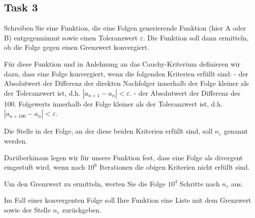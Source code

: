 \documentclass[11pt]{article}
\begin{document}
    \subsection{Task 3}\label{task-3}

Schreiben Sie eine Funktion, die eine Folgen generierende Funktion (hier
A oder B) entgegennimmt sowie einen Toleranzwert \(\varepsilon\). Die
Funktion soll dann ermitteln, ob die Folge gegen einen Grenzwert
konvergiert.

Für diese Funktion und in Anlehnung an das Cauchy-Kriterium definieren
wir dazu, dass eine Folge konvergiert, wenn die folgenden Kriterien
erfüllt sind: - der Absolutwert der Differenz der direkten Nachfolger
innerhalb der Folge kleiner als der Toleranzwert ist, d.h.
\(|a_{n+1} - a_{n}|<\varepsilon\). - der Absolutwert der Differenz des
100. Folgewerts innerhalb der Folge kleiner als der Toleranzwert ist,
d.h. \(|a_{n+100} - a_{n}|<\varepsilon\).

Die Stelle in der Folge, an der diese beiden Kriterien erfüllt sind,
soll \(n_{\varepsilon}\) genannt werden.

Darüberhinaus legen wir für unsere Funktion fest, dass eine Folge als
divergent eingestuft wird, wenn nach \(10^6\) Iterationen die obigen
Kriterien nicht erfüllt sind.

Um den Grenzwert zu ermitteln, werten Sie die Folge \(10^4\) Schritte
nach \(n_{\varepsilon}\) aus.

Im Fall einer konvergenten Folge soll Ihre Funktion eine Liste mit dem
Grenzwert sowie der Stelle \(n_{\varepsilon}\) zurückgeben.
\end{document}
